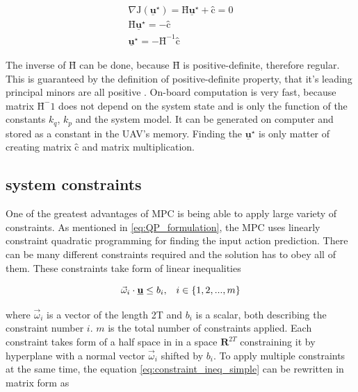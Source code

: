\documentclass{article}
\newcommand{\uvec}{\textbf{\underline{u}}}
\newcommand{\macoi}{\vec{\omega}_i}
\begin{document}
\begin{equation}
\label{eq:J_local_min}
\begin{split}
\nabla\mathrm{J}(\underline{\textbf{u}}^{\star}) = \textbf{\^H}\underline{\textbf{u}}^{\star} + \textbf{\^c} = 0 \\
\textbf{\^H}\underline{\textbf{u}}^{\star} = - \textbf{\^c} \\
\underline{\textbf{u}}^{\star} = -\textbf{\^H}^{-1}\textbf{\^c}
\end{split}
\end{equation}

The inverse of $\textbf{\^H}$ can be done, because $\textbf{\^H}$ is positive-definite, therefore regular. This is guaranteed by the definition of positive-definite property, that it's leading principal minors are all positive \cite{chong2013introduction}. On-board computation is very fast, because matrix $\textbf{\^H}^-1$ does not depend on the system state and is only the function of the constants $k_q$, $k_p$ and the system model. It can be generated on computer and stored as a constant in the UAV's memory. Finding the $\underline{\textbf{u}}^{\star}$ is only matter of creating matrix $\textbf{\^c}$ and matrix multiplication.


\subsection{system constraints} \label{sec:system_constraints}
One of the greatest advantages of MPC is being able to apply large variety of constraints. As mentioned in \ref{eq:QP_formulation}, the MPC uses linearly constraint quadratic programming for finding the input action prediction. There can be many different constraints required and the solution has to obey all of them. These constraints take form of linear inequalities

\begin{equation}
\label{eq:constraint_ineq_simple}
\macoi \cdot \uvec \leq b_i, \;\;\; i \in \{1, 2, ..., m\}
\end{equation}

where $\vec{\omega}_i$ is a vector of the length 2T and $b_i$ is a scalar, both describing the constraint number $i$. $m$ is the total number of constraints applied. Each constraint takes form of a half space in in a space $\textbf{R}^{2T}$ constraining it by hyperplane with a normal vector $\vec{\omega}_i$ shifted by $b_i$. To apply multiple constraints at the same time, the equation \ref{eq:constraint_ineq_simple} can be rewritten in matrix form as 
\end{document}
